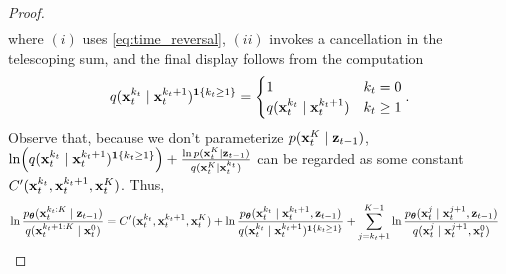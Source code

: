 \begin{proof}
\begin{align*}
\end{align*}
where $(i)$ uses \ref{eq:time_reversal}, $(ii)$ invokes a cancellation in the telescoping sum, and the final display follows from the computation 
\begin{align}
q(\mathbf{x}_t^{k_t} \mid \mathbf{x}_{t}^{k_t+1})^{\mathbf{1}\{k_t \ge 1\}} = \begin{cases} 1 & k_t = 0 \\
q(\mathbf{x}_t^{k_t} \mid \mathbf{x}_{t}^{k_t+1}) & k_t \ge 1
\end{cases}.
\end{align}
Observe that, because we don't parameterize $p (\mathbf{x}_t^{K}\mid \mathbf{z}_{t-1})$,  $\ln (q(\mathbf{x}_t^{k_t} \mid \mathbf{x}_{t}^{k_t+1})^{\mathbf{1}\{k_t \ge 1\}})  + 
\frac{\ln  p (\mathbf{x}_t^{K}\mid \mathbf{z}_{t-1})}{q(\mathbf{x}_{t}^{K} \mid \mathbf{x}_t^{k_t})}$ can be regarded as some constant $C'(\mathbf{x}_t^{k_t},\mathbf{x}_t^{k_t+1},\mathbf{x}_t^K)$. Thus, 
\begin{align}
&\ln \frac{ p_{\bm{\theta}}(\mathbf{x}_{t}^{k_t:K} \mid \mathbf{z}_{t-1})}{q(\mathbf{x}_t^{k_t+1:K} \mid \mathbf{x}^{0}_t)} = C'(\mathbf{x}_t^{k_t},\mathbf{x}_t^{k_t+1},\mathbf{x}_t^K) + \ln \frac{p_{\bm{\theta}}(\mathbf{x}_t^{k_t} \mid \mathbf{x}_{t}^{k_t+1},  \mathbf{z}_{t-1})}{q(\mathbf{x}_t^{k_t} \mid \mathbf{x}_{t}^{k_t+1})^{\mathbf{1}\{k_t \ge 1\}}}  + \sum_{j=k_{t}+1}^{K-1}\ln \frac{p_{\bm{\theta}}(\mathbf{x}_{t}^{j} \mid \mathbf{x}_{t}^{j+1}, \mathbf{z}_{t-1})}{q(\mathbf{x}_{t}^{j} \mid \mathbf{x}_t^{j+1},\mathbf{x}_t^0)} \label{eq:thing2}
\end{align}



\end{proof}
